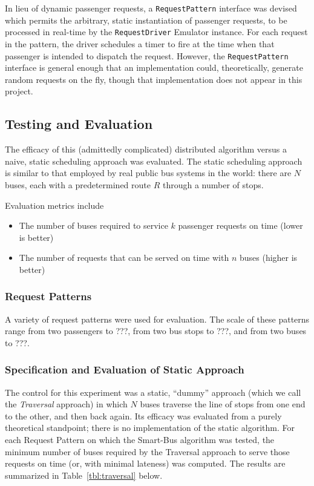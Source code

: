 \documentclass[runningheads]{llncs}
\begin{document}
In lieu of dynamic passenger requests, a \lstinline{RequestPattern} interface was devised which permits the arbitrary, static instantiation of passenger requests, to be processed in real-time by the \lstinline{RequestDriver} Emulator instance. For each request in the pattern, the driver schedules a timer to fire at the time when that passenger is intended to dispatch the request. However, the \lstinline{RequestPattern} interface is general enough that an implementation could, theoretically, generate random requests on the fly, though that implementation does not appear in this project.

\subsection{Testing and Evaluation}
The efficacy of this (admittedly complicated) distributed algorithm versus a naive, static scheduling approach was evaluated. The static scheduling approach is similar to that employed by real public bus systems in the world: there are $N$ buses, each with a predetermined route $R$ through a number of stops.

Evaluation metrics include
\begin{itemize}
	\item The number of buses required to service $k$ passenger requests on time (lower is better)
	\item The number of requests that can be served on time with $n$ buses (higher is better)
\end{itemize}

\subsubsection{Request Patterns}
A variety of request patterns were used for evaluation. The scale of these patterns range from two passengers to ???, from two bus stops to ???, and from two buses to ???.

\subsubsection{Specification and Evaluation of Static Approach}
The control for this experiment was a static, ``dummy'' approach (which we call the \emph{Traversal} approach) in which $N$ buses traverse the line of stops from one end to the other, and then back again. Its efficacy was evaluated from a purely theoretical standpoint; there is no implementation of the static algorithm. For each Request Pattern on which the Smart-Bus algorithm was tested, the minimum number of buses required by the Traversal approach to serve those requests on time (or, with minimal lateness) was computed. The results are summarized in Table~\ref{tbl:traversal} below.
\end{document}
